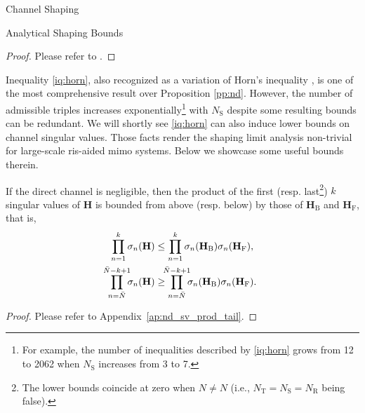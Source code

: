 \documentclass[journal]{IEEEtran}
\begin{document}
\begin{section}{Channel Shaping}
\begin{subsection}{Analytical Shaping Bounds}
		\begin{proof}
			Please refer to \cite[Theorem~8]{Fulton2000}.
		\end{proof}

		Inequality \eqref{iq:horn}, also recognized as a variation of Horn's inequality \cite{Bhatia2001}, is one of the most comprehensive result over Proposition \ref{pp:nd}.
		However, the number of admissible triples increases exponentially\footnote{For example, the number of inequalities described by \eqref{iq:horn} grows from 12 to 2062 when $N_\mathrm{S}$ increases from 3 to 7.} with $N_\mathrm{S}$ despite some resulting bounds can be redundant.
		We will shortly see \eqref{iq:horn} can also induce lower bounds on channel singular values.
		Those facts render the shaping limit analysis non-trivial for large-scale \gls{ris}-aided \gls{mimo} systems.
		Below we showcase some useful bounds therein.

		\begin{corollary}
			\label{co:nd_sv_prod_tail}
			If the direct channel is negligible,
			then the product of the first (resp. last\footnote{The lower bounds coincide at zero when $N \ne N$ (i.e., $N_\mathrm{T} = N_\mathrm{S} = N_\mathrm{R}$ being false).}) $k$ singular values of $\mathbf{H}$ is bounded from above (resp. below) by those of $\mathbf{H}_\mathrm{B}$ and $\mathbf{H}_\mathrm{F}$, that is,
			\begin{subequations}
				\begin{align}
					\prod_{n=1}^k \sigma_n(\mathbf{H})                   & \le \prod_{n=1}^k \sigma_n(\mathbf{H}_\mathrm{B}) \sigma_n(\mathbf{H}_\mathrm{F}), \label{iq:sv_nd_prod_largest}                    \\
					\prod_{n=\bar{N}}^{\mathclap{\bar{N}-k+1}} \sigma_n(\mathbf{H}) & \ge \prod_{n=\bar{N}}^{\mathclap{\bar{N}-k+1}} \sigma_n(\mathbf{H}_\mathrm{B}) \sigma_n(\mathbf{H}_\mathrm{F}). \label{iq:sv_nd_prod_smallest}
				\end{align}
			\end{subequations}
		\end{corollary}

		\begin{proof}
			Please refer to Appendix~\ref{ap:nd_sv_prod_tail}.
		\end{proof}


\end{subsection}
\end{section}
\end{document}
